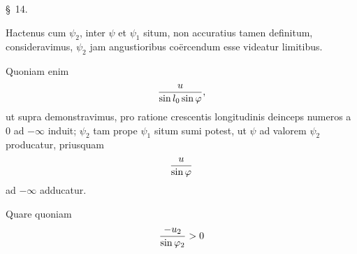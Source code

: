 \begin{center}\S\ 14.\end{center}

Hactenus cum $\psi_2$, inter $\psi$ et $\psi_1$ situm, non accuratius tamen definitum, consideravimus, $\psi_2$ jam angustioribus coërcendum esse videatur limitibus.

Quoniam enim
\[
 {u\over \sin l_0\sin\varphi},
\]
ut supra demonstravimus, pro ratione crescentis longitudinis deinceps numeros a $0$ ad $-\infty$ induit; $\psi_2$ tam prope $\psi_1$ situm sumi potest, ut $\psi$ ad valorem $\psi_2$ producatur, priusquam
\[
 {u\over \sin\varphi}
\]
ad $-\infty$ adducatur.

Quare quoniam
\[
 {-u_2\over \sin\varphi_2}>0
\]
